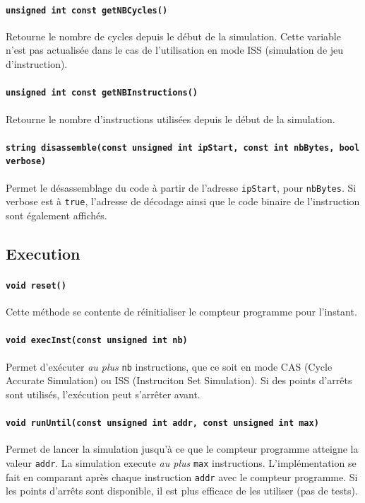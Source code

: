\paragraph{\texttt{unsigned int const getNBCycles()}} Retourne le nombre de cycles depuis le début de la simulation. Cette variable n'est pas actualisée dans le cas de l'utilisation en mode ISS (simulation de jeu d'instruction).
\paragraph{\texttt{unsigned int const getNBInstructions()}} Retourne le nombre d'instructions utilisées depuis le début de la simulation.
\paragraph{\texttt{string disassemble(const unsigned int ipStart, const int nbBytes, bool verbose)}} Permet le désassemblage du code à partir de l'adresse \texttt{ipStart}, pour \texttt{nbBytes}. Si verbose est à \texttt{true}, l'adresse de décodage ainsi que le code binaire de l'instruction sont également affichés.

\subsection{Execution}
\paragraph{\texttt{void reset()}}
Cette méthode se contente de réinitialiser le compteur programme pour l'instant.

\paragraph{\texttt{void execInst(const unsigned int nb)}} Permet d'exécuter \emph{au plus} \texttt{nb} instructions, que ce soit en mode CAS (Cycle Accurate Simulation) ou ISS (Instruciton Set Simulation). Si des points d'arrêts sont utilisés, l'exécution peut s'arrêter avant.

\paragraph{\texttt{void runUntil(const unsigned int addr, const unsigned int max)}} Permet de lancer la simulation jusqu'à ce que le compteur programme atteigne la valeur \texttt{addr}. La simulation execute \emph{au plus} \texttt{max} instructions. L'implémentation se fait en comparant après chaque instruction \texttt{addr} avec le compteur programme. Si les points d'arrêts sont disponible, il est plus efficace de les utiliser (pas de tests).

